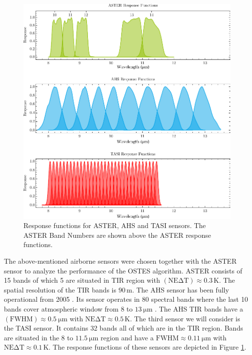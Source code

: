 \begin{figure}[!t]
\centering
\includegraphics[width=0.9\linewidth]{pics/Chapter_04/response_functions_all.pdf}
\vspace{1.5 em}
\caption{Response functions for ASTER, AHS and TASI sensors. The ASTER Band Numbers are shown above the ASTER response functions.}
\label{fig:ResponseFunctions}
\end{figure}
 
The above-mentioned airborne sensors were chosen together with the ASTER sensor to analyze the performance of the OSTES algorithm. ASTER consists of 15 bands of which 5 are situated in TIR region with $\mathrm{(NE\Delta T)} \approx 0.3\,\mathrm{K}$. The spatial resolution of the TIR bands is $90\,\mathrm{m}$. The AHS sensor has been fully operational from 2005 \cite{FM05}. Its sensor operates in 80 spectral bands where the last 10 bands cover atmospheric window from 8 to $\SI{13}{\micro\meter}$ \cite{SJ06}. The AHS TIR bands have a $\mathrm{(FWHM)} \approx \SI{0.5}{\micro\meter}$ with $\mathrm{NE\Delta T} \approx 0.5\,\mathrm{K}$. The third sensor we will consider is the TASI sensor. It contains 32 bands all of which are in the TIR region. Bands are situated in the 8 to $\SI{11.5}{\micro\meter}$ region and have a $\mathrm{FWHM} \approx \SI{0.11}{\micro\meter}$ with $\mathrm{NE\Delta T} \approx 0.1\,\mathrm{K}$. The response functions of these sensors are depicted in Figure \ref{fig:ResponseFunctions}.

